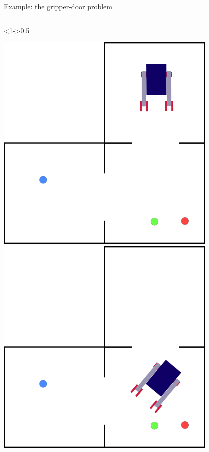 \begin{frame}[c,fragile]{Example: the gripper-door problem}
    \begin{columns}[T]
        \begin{column}<1->{0.5\textwidth}
            \centering
    
            \begin{overprint}
                \includegraphics[width = 0.8\textwidth]{images/3_rooms/gd_3_0.png}
                \includegraphics[width = 0.8\textwidth]{images/3_rooms/gd_3_1.png}

\end{overprint}
\end{column}
\end{columns}
\end{frame}

